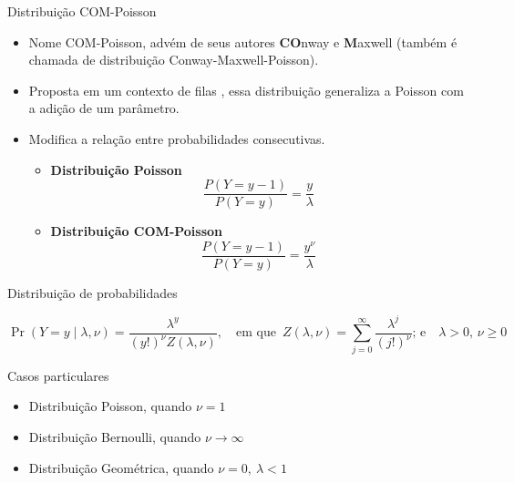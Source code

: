\documentclass[10pt, aspectratio=169]{beamer}\usepackage[]{graphicx}\usepackage[]{color}
\begin{document}
\begin{frame}[allowframebreaks]{Distribuição COM-Poisson}

\begin{itemize}
    \item Nome COM-Poisson, advém de seus autores {\bf CO}nway e
    {\bf M}axwell (também é chamada de distribuição
    Conway-Maxwell-Poisson).
    \item Proposta em um contexto de filas \cite{Conway1962},
    essa distribuição generaliza a Poisson com a adição de um parâmetro.
    \item Modifica a relação entre probabilidades consecutivas.
    \begin{multicols}{2}
        \begin{itemize}
            \item {\bf Distribuição Poisson}\\
            $$\frac{P(Y = y-1)}{P(Y = y)} = \frac{y}{\lambda}$$
            \item {\bf Distribuição COM-Poisson}\\
            $$\frac{P(Y = y-1)}{P(Y = y)} = \frac{y^\nu}{\lambda}$$
        \end{itemize}
    \end{multicols}   
\end{itemize}

\framebreak

\begin{block}{Distribuição de probabilidades}
\begin{center}
\begin{equation*} 
    \Pr(Y = y \mid \lambda, \nu) = \frac{\lambda^y}{(y!)^\nu 
    Z(\lambda, \nu)}, \quad \textrm{em que }\, Z(\lambda, \nu) = 
    \sum_{j=0}^\infty \frac{\lambda^j}{(j!)^\nu} \textrm{; e}\quad
    \lambda > 0, \, \nu \geq 0
\end{equation*}
\end{center}
\end{block}

\begin{block}{Casos particulares}
\begin{itemize}
	\item Distribuição Poisson, quando $\nu = 1$
	\item Distribuição Bernoulli, quando $\nu \rightarrow \infty$
	\item Distribuição Geométrica, quando $\nu = 0,\ \lambda < 1$
\end{itemize}
\end{block}
\end{frame}
\end{document}

